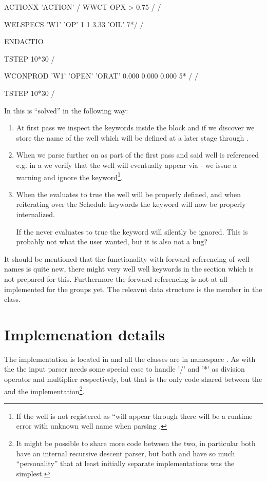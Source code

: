 \begin{deck}
ACTIONX
   'ACTION' /
   WWCT OPX  > 0.75 /
/

WELSPECS
  'W1'  'OP'  1 1 3.33  'OIL' 7*/
/

ENDACTIO

TSTEP
  10*30 /

WCONPROD
 'W1'      'OPEN'      'ORAT'      0.000      0.000      0.000  5* /
/

TSTEP
  10*30 /

\end{deck}

In \flow{} this is ``solved'' in the following way:
\begin{enumerate}
\item At first pass we inspect the keywords inside the \actionx{} block and if
  we discover  we store the name of the well which will be defined
  at a later stage through \actionx{}.
\item When we parse further on as part of the first pass and said well is
  referenced e.g. in a  we verify that the well will eventually
  appear via \actionx{} - we issue a warning and ignore the 
  keyword\footnote{If the well is not registered as ``will appear through
  \actionx{} there will be a runtime error with unknown well name when parsing
  .}.
\item When the \actionx{} evaluates to true the well will be properly defined,
  and when reiterating over the Schedule keywords the  keyword will
  now be properly internalized.

  If the \actionx{} never evaluates to true the  keyword will
  silently be ignored. This is probably not what the user wanted, but it is also
  not a bug?
\end{enumerate}
It should be mentioned that the functionality with forward referencing of well
names is quite new, there might very well well keywords in the 
section which is not prepared for this. Furthermore the forward referencing is
not at all implemented for the groups yet. The releavnt data structure is the
member  in the 
class.

\section{Implemenation details}
The \actionx{} implementation is located in
 and all the classes are in namespace
. As with the \udq{} the input parser needs some special
case to handle '/' and '*' as division operator and multiplier respectively, but
that is the only code shared between the \udq{} and the \actionx{}
implementation\footnote{It might be possible to share more code between the two,
in particular both have an internal recursive descent parser, but both \udq{}
and \actionx{} have so much ``personality'' that at least initially separate
implementations was the simplest.}.


